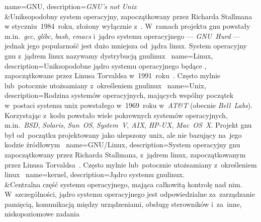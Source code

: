 %
%

{
	name={GNU},
	description={\emph{GNU’s not Unix}\\&Uniksopodobny system operacyjny, zapoczątkowany przez Richarda Stallmana w styczniu~1984~roku, złożony wyłącznie z~. W~ramach projektu \gls{gnu} powstały m.in.~\emph{gcc}, \emph{glibc}, \emph{bash}, \emph{emacs} i~jądro systemu operacyjnego --- \emph{GNU~Hurd} --- jednak jego popularność jest dużo mniejsza od~jądra \gls{linux}. System operacyjny \gls{gnu} z~jądrem \gls{linux} nazywamy dystrybucją \gls{gnulinux}~\cite{gnu,gnulinux,gnu-faq,wiki:linux-naming-controversy}}
}
{
	name={Linux},
	description={Uniksopodobne jądro systemu operacyjnego będące , zapoczątkowane przez Linusa Torvaldsa w~1991~roku~\cite{linux-kernel}. Często mylnie lub~potocznie utożsamiany z~określeniem \gls{gnulinux}~\cite{gnu-faq,wiki:linux-naming-controversy}}
}
{
	name={Unix},
	description={Rodzina systemów operacyjnych, mających wspólny początek w~postaci systemu \gls{unix} powstałego w~1969~roku w~\emph{AT\&T} (obecnie \emph{Bell~Labs}). Korzystając z~kodu  powstało wiele pokrewnych systemów operacyjnych, m.in.~\emph{BSD}, \emph{Solaris}, \emph{Sun~OS}, \emph{System~V}, \emph{AIX}, \emph{HP-UX}, \emph{Mac~OS~X}. Projekt \gls{gnu} był od~początku projektowany jako ulepszony \gls{unix}, ale nie bazujący na~jego kodzie źródłowym~\cite{gnu-initial-msg}}
}
{
	name={GNU/Linux},
	description={System operacyjny \gls{gnu} zapoczątkowany przez Richarda Stallmana, z~jądrem \gls{linux}, zapoczątkowanym przez Linusa Torvaldsa~\cite{gnulinux}. Często mylnie lub~potocznie utożsamiany z~określeniem \gls{linux}~\cite{gnu-faq,wiki:linux-naming-controversy}}
}
{
	name={kernel},
	description={Jądro systemu \gls{gnulinux}.\\&Centralna część systemu operacyjnego, mająca całkowitą kontrolę nad nim. W~szczególności, jądro systemu operacyjnego jest odpowiedzialne za~zarządzanie pamięcią, komunikacją między urządzeniami, obsługę sterowników i~za~inne, niskopoziomowe zadania}
}
